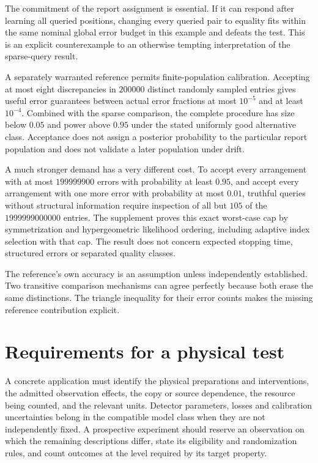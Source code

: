 The commitment of the report assignment is essential. If it can respond after learning all queried positions, changing every queried pair to equality fits within the same nominal global error budget in this example and defeats the test. This is an explicit counterexample to an otherwise tempting interpretation of the sparse-query result.

A separately warranted reference permits finite-population calibration. Accepting at most eight discrepancies in $200000$ distinct randomly sampled entries gives useful error guarantees between actual error fractions at most $10^{-5}$ and at least $10^{-4}$. Combined with the sparse comparison, the complete procedure has size below $0.05$ and power above $0.95$ under the stated uniformly good alternative class. Acceptance does not assign a posterior probability to the particular report population and does not validate a later population under drift.

A much stronger demand has a very different cost. To accept every arrangement with at most $199999900$ errors with probability at least $0.95$, and accept every arrangement with one more error with probability at most $0.01$, truthful queries without structural information require inspection of all but $105$ of the $1999999000000$ entries. The supplement proves this exact worst-case cap by symmetrization and hypergeometric likelihood ordering, including adaptive index selection with that cap. The result does not concern expected stopping time, structured errors or separated quality classes.

The reference's own accuracy is an assumption unless independently established. Two transitive comparison mechanisms can agree perfectly because both erase the same distinctions. The triangle inequality for their error counts makes the missing reference contribution explicit.



\section{Requirements for a physical test}
\label{col:physical}

A concrete application must identify the physical preparations and interventions, the admitted observation effects, the copy or source dependence, the resource being counted, and the relevant units. Detector parameters, losses and calibration uncertainties belong in the compatible model class when they are not independently fixed. A prospective experiment should reserve an observation on which the remaining descriptions differ, state its eligibility and randomization rules, and count outcomes at the level required by its target property.

